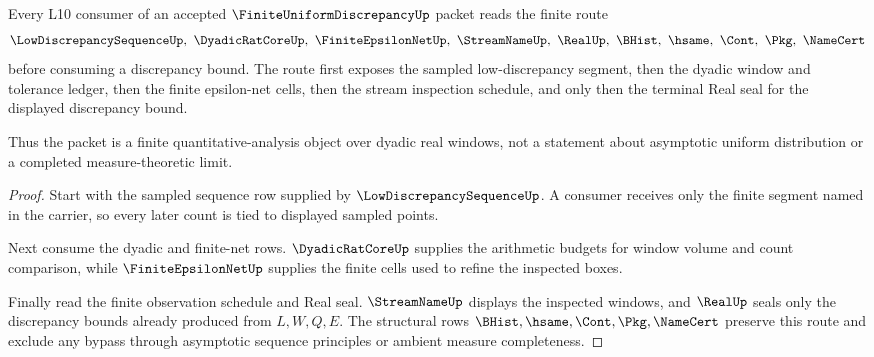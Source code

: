 \begin{theorem}
\label{thm:finite-uniform-discrepancy-l10-route}
Every L10 consumer of an accepted $\FiniteUniformDiscrepancyUp$ packet reads the finite route
$$
\LowDiscrepancySequenceUp,\ \DyadicRatCoreUp,\ \FiniteEpsilonNetUp,\ \StreamNameUp,\ \RealUp,\ \BHist,\ \hsame,\ \Cont,\ \Pkg,\ \NameCert
$$
before consuming a discrepancy bound. The route first exposes the sampled low-discrepancy segment, then the dyadic window and tolerance ledger, then the finite epsilon-net cells, then the stream inspection schedule, and only then the terminal Real seal for the displayed discrepancy bound.

Thus the packet is a finite quantitative-analysis object over dyadic real windows, not a statement about asymptotic uniform distribution or a completed measure-theoretic limit.
\end{theorem}
\begin{proof}
Start with the sampled sequence row supplied by $\LowDiscrepancySequenceUp$. A consumer receives only the finite segment named in the carrier, so every later count is tied to displayed sampled points.

Next consume the dyadic and finite-net rows. $\DyadicRatCoreUp$ supplies the arithmetic budgets for window volume and count comparison, while $\FiniteEpsilonNetUp$ supplies the finite cells used to refine the inspected boxes.

Finally read the finite observation schedule and Real seal. $\StreamNameUp$ displays the inspected windows, and $\RealUp$ seals only the discrepancy bounds already produced from $L,W,Q,E$. The structural rows $\BHist,\hsame,\Cont,\Pkg,\NameCert$ preserve this route and exclude any bypass through asymptotic sequence principles or ambient measure completeness.
\end{proof}



